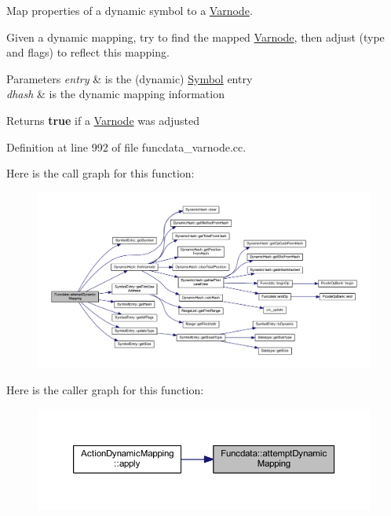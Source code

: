 Map properties of a dynamic symbol to a \mbox{\hyperlink{class_varnode}{Varnode}}. 

Given a dynamic mapping, try to find the mapped \mbox{\hyperlink{class_varnode}{Varnode}}, then adjust (type and flags) to reflect this mapping. 
\begin{DoxyParams}{Parameters}
{\em entry} & is the (dynamic) \mbox{\hyperlink{class_symbol}{Symbol}} entry \\
\hline
{\em dhash} & is the dynamic mapping information \\
\hline
\end{DoxyParams}
\begin{DoxyReturn}{Returns}
{\bfseries{true}} if a \mbox{\hyperlink{class_varnode}{Varnode}} was adjusted 
\end{DoxyReturn}


Definition at line 992 of file funcdata\+\_\+varnode.\+cc.

Here is the call graph for this function\+:
\nopagebreak
\begin{figure}[H]
\begin{center}
\leavevmode
\includegraphics[width=350pt]{class_funcdata_adeee32fc648486d26cd17ebb37bb118f_cgraph}
\end{center}
\end{figure}
Here is the caller graph for this function\+:
\nopagebreak
\begin{figure}[H]
\begin{center}
\leavevmode
\includegraphics[width=350pt]{class_funcdata_adeee32fc648486d26cd17ebb37bb118f_icgraph}
\end{center}
\end{figure}
\mbox{\label{class_funcdata_af9350996f6f24052be034b59bfd383b2}} 
